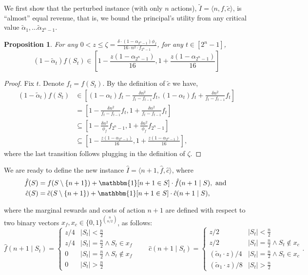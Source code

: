 \documentclass[11pt]{article}
\newtheorem{proposition}{Proposition}
\newcommand{\inst}[3]{\langle #1, #2, #3 \rangle}
\newcommand{\indicator}[1]{\mathbbm{1}[{#1}]}
\newcommand{\tc}{\tilde{c}}
\newcommand{\talpha}{\tilde{\alpha}}
\newcommand{\hf}{\hat{f}}
\newcommand{\hc}{\hat{c}}
\newcommand{\tI}{\tilde{I}}
\newcommand{\InstTildeI}{\tI = \inst{n}{f}{\tc}}
\newcommand{\hI}{\hat{I}}
\newcommand{\InstHatI}{\hI = \inst{n+1}{\hf}{\hc}}
\begin{document}
We first show that the perturbed instance (with only $n$ actions), $\InstTildeI$, is ``almost'' equal revenue, that is, we bound the principal's utility from any critical value $\talpha_1, \dots \talpha_{2^n-1}$.
\begin{proposition}\label{prop:eps_for_revenue_bound}
For any $0 < z \le \zeta = \frac{\delta \cdot (1-\alpha_{2^n-1}) \phi_f}{16\cdot n^2 \cdot f_{2^n-1}}$, for any $t \in [2^n-1]$, 
$$
(1-\talpha_t)f(S_t) \in \left[1 - \frac{z(1-\alpha_{2^n-1})}{16}, 1 + \frac{z(1-\alpha_{2^n-1})}{16} \right]
$$
\end{proposition}
\begin{proof}
    Fix $t$. Denote $f_t = f(S_t)$. By the definition of $\tc$ we have,
    \begin{align*}
        (1-\talpha_t)f(S_t)
        &\in
        \left[(1-\alpha_t)f_t - \frac{\delta n^2}{f_t-f_{t-1}}f_t, (1-\alpha_t)f_t + \frac{\delta n^2}{f_t-f_{t-1}}f_t \right] \\
        &=
        \left[1 - \frac{\delta n^2}{f_t-f_{t-1}}f_t, 1 + \frac{\delta n^2}{f_t-f_{t-1}}f_t \right] \\
        &\subseteq
        \left[1 - \frac{\delta n^2}{\phi_f}f_{2^n-1}, 1 + \frac{\delta n^2}{\phi_f}f_{2^n-1} \right] \\
        &\subseteq
        \left[1 - \frac{z(1-\alpha_{2^n-1})}{16}, 1 + \frac{z(1-\alpha_{2^n-1})}{16} \right],
    \end{align*}
    where the last transition follows plugging in the definition of $\zeta$.
\end{proof}
We are ready to define the new instance $\InstHatI$, where 
\begin{align*}
\hf(S)&=f(S\setminus\{n+1\})+\indicator{n+1 \in S}\cdot\hf(n+1 \mid S), \text{ and } \\
\hc(S)&=\tc(S\setminus\{n+1\})+\indicator{n+1 \in S}\cdot\hc(n+1 \mid S),
\end{align*}

where the marginal rewards and costs of action $n+1$ are defined with respect to two binary vectors $x_f,x_c \in \{0,1\}^{\binom{n}{n/2}}$, as follows:
$$
\hf(n+1 \mid S_t) = 
\begin{cases}
    z/4 & |S_t| < \frac{n}{2} \\
    z/4 & |S_t| = \frac{n}{2} \land S_t \in x_f \\
    0 & |S_t| = \frac{n}{2} \land S_t \notin x_f \\
    0 & |S_t| > \frac{n}{2}
\end{cases}
\qquad 
\hc(n+1 \mid S_t) = 
\begin{cases}
    z/2 & |S_t| < \frac{n}{2} \\
    z/2 & |S_t| = \frac{n}{2} \land S_t \notin x_c \\
    (\talpha_t\cdot z)/4 & |S_t| = \frac{n}{2} \land S_t \in x_c \\
    (\talpha_1\cdot z)/8 & |S_t| > \frac{n}{2}
\end{cases}.
$$
\end{document}
